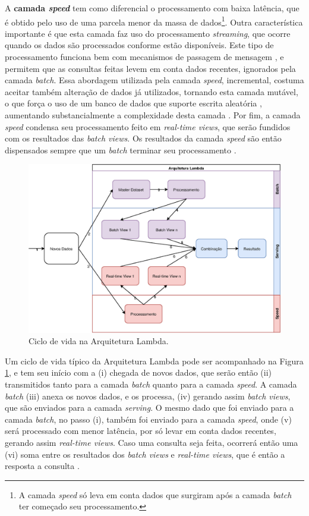 \newpage
A \textbf{camada \textit{speed}} tem como diferencial o processamento com baixa
latência, que é obtido pelo uso de uma parcela menor da massa de dados\footnote{
A camada \textit{speed} só leva em conta dados que surgiram após a camada
\textit{batch} ter começado seu processamento.}. Outra característica importante
é que esta camada faz uso do processamento \textit{streaming}, que ocorre
quando os dados são processados conforme estão disponíveis. Este tipo de
processamento funciona bem com mecanismos de passagem de mensagem
\cite{marz2015}, e permitem que as consultas feitas levem em conta dados
recentes, ignorados pela camada \textit{batch}. Essa abordagem utilizada
pela camada \textit{speed}, incremental, costuma aceitar também alteração de
dados já utilizados, tornando esta camada mutável, o que força o uso de um
banco de dados que suporte escrita aleatória \cite{marz2015}, aumentando
substancialmente a complexidade desta camada \cite{marz2015}. Por fim, a
camada \textit{speed} condensa seu processamento feito em
\textit{real-time views}, que serão fundidos com os resultados das
\textit{batch views}. Os resultados da camada \textit{speed} são então
dispensados sempre que um \textit{batch} terminar seu processamento
\cite{marz2015}.

\begin{figure}
  \centering
    \includegraphics[width=\textwidth]{figuras/lambda-lifecycle.eps}
  \caption{Ciclo de vida na Arquitetura Lambda.}
  \label{fig:lambda-lifecycle}
\end{figure}

Um ciclo de vida típico da Arquitetura Lambda pode ser acompanhado na Figura
\ref{fig:lambda-lifecycle}, e tem seu início com a (i) chegada
de novos dados, que serão então (ii) transmitidos tanto para a camada
\textit{batch} quanto para a camada \textit{speed}. A camada \textit{batch}
(iii) anexa os novos dados, e os processa, (iv) gerando assim
\textit{batch views}, que são enviados para a camada \textit{serving}. O mesmo
dado que foi enviado para a camada \textit{batch}, no passo (i), também foi
enviado para a camada \textit{speed}, onde (v) será processado com menor latência,
por só levar em conta dados recentes, gerando assim \textit{real-time views}. 
Caso uma consulta seja feita, ocorrerá então uma (vi) soma entre os resultados
dos \textit{batch views} e \textit{real-time views}, que é então a resposta
a consulta \cite{marz2015}.

